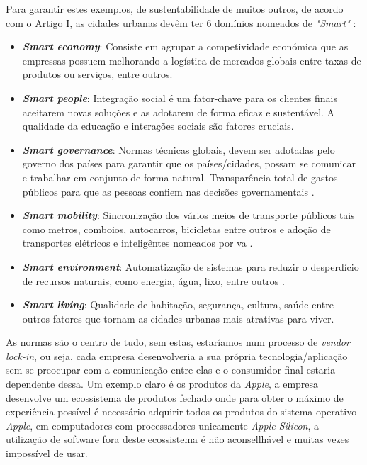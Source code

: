 Para garantir estes exemplos, de sustentabilidade de muitos outros, de acordo com o Artigo I, as cidades urbanas devêm ter 6 domínios nomeados de \textit{"Smart"} \cite{article}:
\begin{itemize}
\item \textbf{\textit{Smart economy}}:  Consiste em agrupar a competividade económica que as empressas possuem melhorando a logística de mercados globais entre taxas de produtos ou serviços, entre outros.
\item \textbf{\textit{Smart people}}:  Integração social  é um fator-chave para os clientes finais aceitarem novas soluções e as adotarem de forma eficaz e sustentável. A qualidade da educação e interações sociais são fatores cruciais.
\item \textbf{\textit{Smart governance}}: Normas técnicas globais, devem ser adotadas pelo governo dos países para garantir que os países/cidades, possam se comunicar e trabalhar em conjunto de forma natural. Transparência total de gastos públicos para que as pessoas confiem nas decisões governamentais \cite{article}.
\item \textbf{\textit{Smart mobility}}: Sincronização dos vários meios de transporte públicos tais como metros, comboios, autocarros, bicicletas entre outros e adoção de transportes elétricos e inteligêntes nomeados por \gls{va} \cite{CLEOPHAS2019801}.
\item \textbf{\textit{Smart environment}}: Automatização de sistemas para reduzir o desperdício de recursos naturais, como energia, água, lixo, entre outros \cite{su162411265}.
\item \textbf{\textit{Smart living}}: Qualidade de habitação, segurança, cultura, saúde entre outros fatores que tornam as cidades urbanas mais atrativas para viver.
\end{itemize}

As normas são o centro de tudo, sem estas, estaríamos num processo de \textit{vendor lock-in}, ou seja, cada empresa desenvolveria a sua própria tecnologia/aplicação sem se preocupar com a comunicação entre elas e o consumidor final estaria dependente dessa.
Um exemplo claro é os produtos da \textit{Apple}, a empresa desenvolve um ecossistema de produtos fechado onde para obter o máximo de experiência possível é necessário adquirir todos os produtos do sistema operativo \textit{Apple}, em computadores com processadores unicamente \textit{Apple Silicon}, a utilização de software  fora deste ecossistema é não aconsellhável e muitas vezes impossível de usar.

